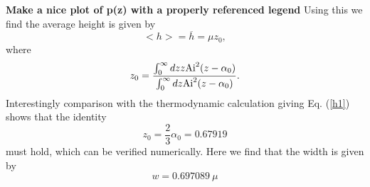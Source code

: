 {\bf Make a nice plot of p(z) with a properly referenced legend}
Using this we find the average height is given by
\begin{equation}
    < h> = \overline h= \mu z_0,
\end{equation}
where 
\begin{equation}
    z_0 = \frac{\int_0^\infty dz z {\rm Ai}^2(z-\alpha_0)}{\int_0^\infty dz {\rm Ai}^2(z-\alpha_0)}.
\end{equation}
Interestingly comparison with the thermodynamic calculation giving Eq. (\ref{h1}) shows that the identity
\begin{equation}
    z_0 = \frac{2}{3}\alpha_0 = 0.67919
\end{equation}
must hold, which can be verified numerically. Here we find that the width is given by
\begin{equation}
    w= 0.697089 \ \mu
\end{equation}


